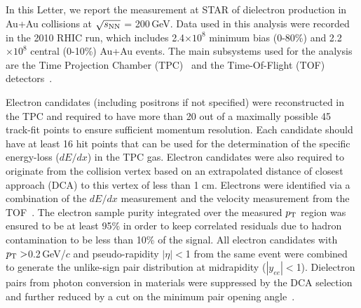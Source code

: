 \documentclass[twocolumn,showpacs,amsmath,amssymb,superscriptaddress,nofootinbib]{revtex4-1}
\newcommand{\sNN}{$\sqrt{s_{\rm NN}}$ }
\begin{document}
In this Letter, we report the measurement at STAR of dielectron production in Au+Au collisions at \sNN = 200\,GeV. Data used in this analysis were recorded in the 2010 RHIC run, which includes 2.4$\times 10^8$ minimum bias (0-80\%) and 2.2$\times 10^8$ central (0-10\%) Au+Au events. The main subsystems used for the analysis are the Time Projection Chamber (TPC)~\cite{tpcnim} and the Time-Of-Flight (TOF) detectors~\cite{tofnim}.

Electron candidates (including positrons if not specified) were reconstructed in the TPC and required to have more than 20 out of a maximally possible 45 track-fit points to ensure sufficient momentum resolution. Each candidate should have at least 16 hit points that can be used for the determination of the specific energy-loss ($dE/dx$) in the TPC gas.
Electron candidates were also required to originate from the collision vertex based on an extrapolated distance of closest approach (DCA) to this vertex of less than 1 cm.
Electrons were identified via a combination of the $dE/dx$ measurement and the velocity measurement from the TOF~\cite{PIDNIM}.
The electron sample purity integrated over the measured $p_{\rm T}$ region was ensured to be at least 95\%
in order to keep correlated residuals due to hadron contamination to be less than 10\% of the signal.
All electron candidates with $p_{\rm T}>$0.2\,GeV/$c$ and pseudo-rapidity $|\eta|<$1 from the same event were combined to generate the unlike-sign pair distribution at midrapidity ($|y_{ee}|<$1). Dielectron pairs from photon conversion in materials were suppressed by the DCA selection and further reduced by a cut on the minimum pair opening angle~\cite{PHENIX}.
\end{document}
